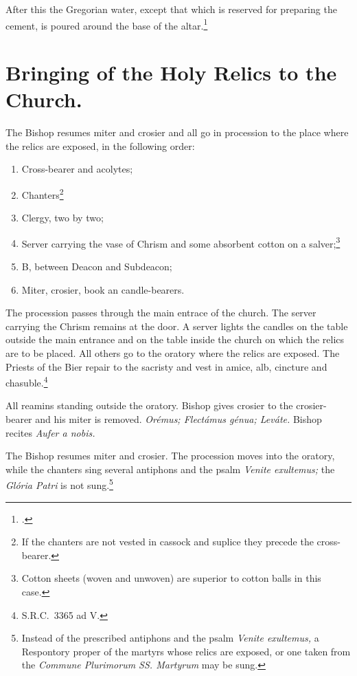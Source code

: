 \documentclass[letterpaper]{report}
\newcommand\src{\textsc{S.R.C.}}
\begin{document}
{After this the Gregorian water, except that which is reserved for preparing the
cement, is poured around the base of the altar.\footcite[If much water remains
only a small quantity of it is poured around the base of the altar, and what is
left is afterwards poured into the \textit{secrarium.}][footnote 1, p.
78.]{consecranda}

\section{Bringing of the Holy Relics to the Church.}

\rubric The Bishop resumes miter and crosier and all go in procession to the place where
the relics are exposed, in the following order:

\begin{enumerate}
    \item Cross-bearer and acolytes;
    \item Chanters\footnote{If the chanters are not vested in cassock and
        suplice they precede the cross-bearer.}
    \item Clergy, two by two;
    \item Server carrying the vase of Chrism and some absorbent cotton on a
        salver;\footnote{Cotton sheets (woven and unwoven) are superior to
        cotton balls in this case.}
    \item B, between Deacon and Subdeacon;
    \item Miter, crosier, book an candle-bearers.
\end{enumerate}

The procession passes through the main entrace of the church. The server
carrying the Chrism remains at the door. A server lights the candles on the
table outside the main entrance and on the table inside the church on which the
relics are to be placed. All others go to the oratory where the relics are
exposed. The Priests of the Bier repair to the sacristy and vest in amice, alb,
cincture and chasuble.\footnote{\src\ 3365 ad V.}

\rubric All reamins standing outside the oratory. Bishop gives crosier to the
crosier-bearer and his miter is removed. \textit{Orémus; Flectámus génua;
Leváte.} Bishop recites \textit{Aufer a nobis.}

\rubric The Bishop resumes miter and crosier. The procession moves into the
oratory, while the chanters sing several antiphons and the psalm \textit{Venite
exultemus;} the \textit{Glória Patri} is not sung.\footnote{Instead of the
prescribed antiphons and the psalm \textit{Venite exultemus,} a Respontory
proper of the martyrs whose relics are exposed, or one taken from the
\textit{Commune Plurimorum SS. Martyrum} may be sung.}

}
\end{document}
